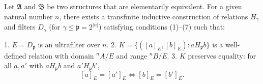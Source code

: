 Let $\mathfrak{A}$ and $\mathfrak{B}$ be two structures that are elementarily equivalent. For a given natural number $n$, there exists a transfinite inductive construction of relations $H_\gamma$ and filters $D_\gamma$ (for $\gamma \leq \mathfrak{p} = 2^{|n|}$) satisfying conditions (1)--(7) such that:

1. $E = D_\mathfrak{p}$ is an ultrafilter over $n$.
2. $K = \{([a]_E, [b]_E) : a H_\mathfrak{p} b\}$ is a well-defined relation with domain $^n A / E$ and range $^n B / E$.
3. $K$ preserves equality: for all $a, a'$ with $a H_\mathfrak{p} b$ and $a' H_\mathfrak{p} b'$,
   $$[a]_E = [a']_E \iff [b]_E = [b']_E.$$
